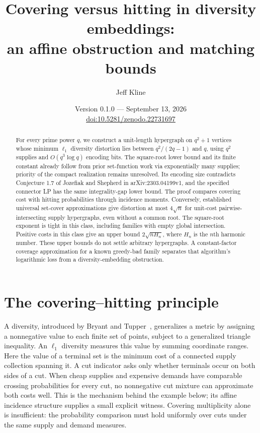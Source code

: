 \documentclass[11pt]{article}
\title{Covering versus hitting in diversity embeddings:\\an affine obstruction and matching bounds}
\author{Jeff Kline}
\date{Version 0.1.0 --- September 13, 2026\\[3pt]\small\href{https://doi.org/10.5281/zenodo.22731697}{doi:10.5281/zenodo.22731697}}
\begin{document}
\maketitle
\begin{abstract}
For every prime power $q$, we construct a unit-length hypergraph on $q^2+1$
vertices whose minimum $\ell_1$ diversity distortion lies between
$q^2/(2q-1)$ and $q$, using $q^2$ supplies and $O(q^3\log q)$ encoding bits.
The square-root lower bound and its finite constant already follow from
prior set-function work via exponentially many supplies; priority of the
compact realization remains unresolved. Its encoding size contradicts
Conjecture 1.7 of Jozefiak and Shepherd in arXiv:2303.04199v1, and the
specified connector LP has the same integrality-gap lower bound.
The proof compares covering cost with hitting probabilities through
incidence moments. Conversely, established universal set-cover
approximations give distortion at most $4\sqrt n$ for unit-cost
pairwise-intersecting supply hypergraphs, even without a common root.
The square-root exponent is tight in this class, including families with
empty global intersection. Positive costs in this class give an upper
bound $2\sqrt{nH_n}$, where $H_n$ is the $n$th harmonic number.
These upper bounds do not settle arbitrary hypergraphs. A constant-factor
coverage approximation for a known greedy-bad family separates that
algorithm's logarithmic loss from a diversity-embedding obstruction.
\end{abstract}

\section{The covering--hitting principle}
A diversity, introduced by Bryant and Tupper~\cite{BT12}, generalizes a
metric by assigning a nonnegative value to each finite set of points,
subject to a generalized triangle inequality. An $\ell_1$ diversity measures
this value by summing coordinate ranges. Here the value of a terminal set is
the minimum cost of a connected supply collection spanning it. A cut indicator asks only whether terminals occur on both sides
of a cut. When cheap supplies and expensive demands have comparable
crossing probabilities for every cut, no nonnegative cut mixture can
approximate both costs well. This is the mechanism behind the example
below; its affine incidence structure supplies a small explicit witness.
Covering multiplicity alone is insufficient: the probability comparison
must hold uniformly over cuts under the same supply and demand measures.
\end{document}
